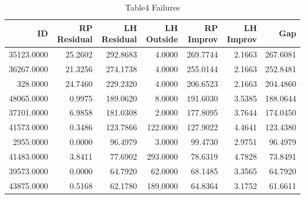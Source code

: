 \begin{table}
\caption{Table4 Failures}
\label{tab:table4_failures}
\begin{tabular}{rrrrrrr}
\toprule
ID & RP Residual & LH Residual & LH Outside & RP Improv & LH Improv & Gap \\
\midrule
35123.0000 & 25.2602 & 292.8683 & 4.0000 & 269.7744 & 2.1663 & 267.6081 \\
36267.0000 & 21.3256 & 274.1738 & 4.0000 & 255.0144 & 2.1663 & 252.8481 \\
328.0000 & 24.7460 & 229.2320 & 4.0000 & 206.6523 & 2.1663 & 204.4860 \\
48065.0000 & 0.9975 & 189.0620 & 8.0000 & 191.6030 & 3.5385 & 188.0644 \\
37101.0000 & 6.9858 & 181.0308 & 2.0000 & 177.8095 & 3.7644 & 174.0450 \\
41573.0000 & 0.3486 & 123.7866 & 122.0000 & 127.9022 & 4.4641 & 123.4380 \\
2955.0000 & 0.0000 & 96.4979 & 3.0000 & 99.4730 & 2.9751 & 96.4979 \\
41483.0000 & 3.8411 & 77.6902 & 293.0000 & 78.6319 & 4.7828 & 73.8491 \\
39573.0000 & 0.0000 & 64.7920 & 62.0000 & 68.1485 & 3.3565 & 64.7920 \\
43875.0000 & 0.5168 & 62.1780 & 189.0000 & 64.8364 & 3.1752 & 61.6611 \\
\bottomrule
\end{tabular}
\end{table}
